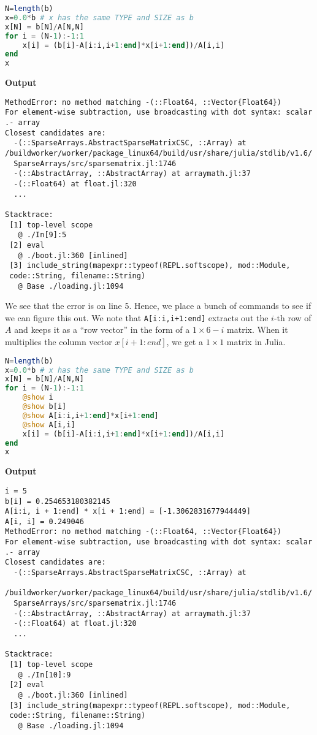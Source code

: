 \begin{lstlisting}[language=Julia,style=mystyle]
N=length(b)
x=0.0*b # x has the same TYPE and SIZE as b
x[N] = b[N]/A[N,N]
for i = (N-1):-1:1
    x[i] = (b[i]-A[i:i,i+1:end]*x[i+1:end])/A[i,i]
end
x
\end{lstlisting}
\textbf{Output} 
\begin{verbatim}
MethodError: no method matching -(::Float64, ::Vector{Float64})
For element-wise subtraction, use broadcasting with dot syntax: scalar .- array
Closest candidates are:
  -(::SparseArrays.AbstractSparseMatrixCSC, ::Array) at /buildworker/worker/package_linux64/build/usr/share/julia/stdlib/v1.6/
  SparseArrays/src/sparsematrix.jl:1746
  -(::AbstractArray, ::AbstractArray) at arraymath.jl:37
  -(::Float64) at float.jl:320
  ...

Stacktrace:
 [1] top-level scope
   @ ./In[9]:5
 [2] eval
   @ ./boot.jl:360 [inlined]
 [3] include_string(mapexpr::typeof(REPL.softscope), mod::Module, 
 code::String, filename::String)
   @ Base ./loading.jl:1094
\end{verbatim}

We see that the error is on line 5. Hence, we place a bunch of \texttt{\@show} commands to see if we can figure this out. We note that \texttt{A[i:i,i+1:end]} extracts out the $i$-th row of $A$ and keeps it as a ``row vector'' in the form of a $1 \times 6-i$ matrix. When it multiplies the column vector $x[i+1:end]$, we get a $1 \times 1$ matrix in Julia. 

\begin{lstlisting}[language=Julia,style=mystyle]
N=length(b)
x=0.0*b # x has the same TYPE and SIZE as b
x[N] = b[N]/A[N,N]
for i = (N-1):-1:1
    @show i
    @show b[i]
    @show A[i:i,i+1:end]*x[i+1:end]
    @show A[i,i]
    x[i] = (b[i]-A[i:i,i+1:end]*x[i+1:end])/A[i,i]
end
x
\end{lstlisting}
\textbf{Output} 
\begin{verbatim}
i = 5
b[i] = 0.254653180382145
A[i:i, i + 1:end] * x[i + 1:end] = [-1.3062831677944449]
A[i, i] = 0.249046
MethodError: no method matching -(::Float64, ::Vector{Float64})
For element-wise subtraction, use broadcasting with dot syntax: scalar .- array
Closest candidates are:
  -(::SparseArrays.AbstractSparseMatrixCSC, ::Array) at 
  /buildworker/worker/package_linux64/build/usr/share/julia/stdlib/v1.6/
  SparseArrays/src/sparsematrix.jl:1746
  -(::AbstractArray, ::AbstractArray) at arraymath.jl:37
  -(::Float64) at float.jl:320
  ...

Stacktrace:
 [1] top-level scope
   @ ./In[10]:9
 [2] eval
   @ ./boot.jl:360 [inlined]
 [3] include_string(mapexpr::typeof(REPL.softscope), mod::Module, 
 code::String, filename::String)
   @ Base ./loading.jl:1094
\end{verbatim}

